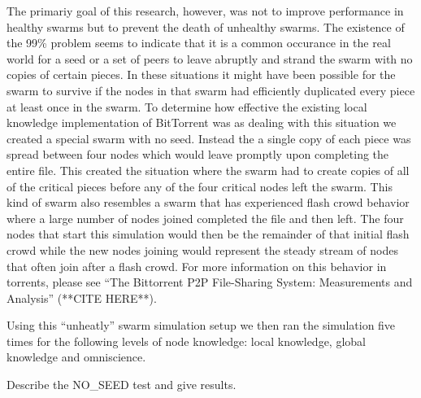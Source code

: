 The primariy goal of this research, however, was not to improve performance in
healthy swarms but to prevent the death of unhealthy swarms. The existence of the
99\% problem seems to indicate that it is a common occurance in the real world for
a seed or a set of peers to leave abruptly and strand the swarm with no copies of certain
pieces. In these situations it might have been possible for the swarm to survive if the nodes
in that swarm had efficiently duplicated every piece at least once in the swarm. To determine
how effective the existing local knowledge implementation of BitTorrent was as dealing with
this situation we created a special swarm with no seed. Instead the a single copy of each piece
was spread between four nodes which would leave promptly upon completing the entire file. This
created the situation where the swarm had to create copies of all of the critical pieces 
before any of the four critical nodes left the swarm. This kind of swarm also resembles a
swarm that has experienced flash crowd behavior where a large number of nodes joined completed
the file and then left. The four nodes that start this simulation would then be the remainder of
that initial flash crowd while the new nodes joining would represent the steady stream of nodes
that often join after a flash crowd. For more information on this behavior in torrents, please
see ``The Bittorrent P2P File-Sharing System: Measurements and Analysis'' (**CITE HERE**). 

Using this ``unheatly'' swarm simulation setup we then ran the simulation five times for the 
following levels of node knowledge: local knowledge, global knowledge and omniscience. 


Describe the NO\_SEED test and give results.
